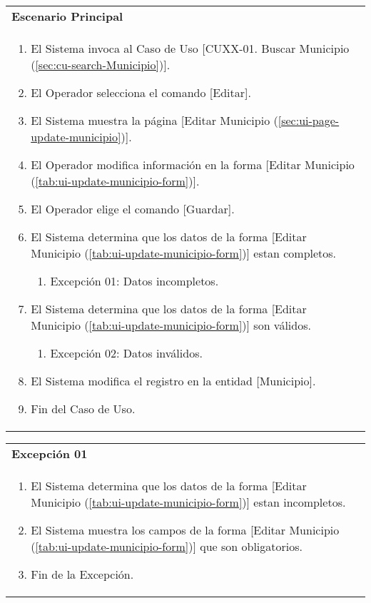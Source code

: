 \begin{tabular}{ p{15.5cm} }
	\textbf{Escenario Principal} \\
	\begin{enumerate}
		\item El Sistema invoca al Caso de Uso [CUXX-01. Buscar Municipio (\ref{sec:cu-search-Municipio})].
		\item El Operador selecciona el comando [Editar].
		\item El Sistema muestra la página [Editar Municipio (\ref{sec:ui-page-update-municipio})].
		\item El Operador modifica información en la forma [Editar Municipio (\ref{tab:ui-update-municipio-form})].
		\item El Operador elige el comando [Guardar].
		\item El Sistema determina que los datos de la forma [Editar Municipio (\ref{tab:ui-update-municipio-form})] estan completos.
			\begin{enumerate}
				\item Excepción 01: Datos incompletos.
			\end{enumerate}
		\item El Sistema determina que los datos de la forma [Editar Municipio (\ref{tab:ui-update-municipio-form})] son válidos.
			\begin{enumerate}
				\item Excepción 02: Datos inválidos.
			\end{enumerate}
		\item El Sistema modifica el registro en la entidad [Municipio].
		\item Fin del Caso de Uso.
	\end{enumerate}
\end{tabular}

\begin{tabular}{ p{15.5cm} }
	\textbf{Excepción 01} \\
	\begin{enumerate}
		\item El Sistema determina que los datos de la forma [Editar Municipio (\ref{tab:ui-update-municipio-form})] estan incompletos.
		\item El Sistema muestra los campos de la forma [Editar Municipio (\ref{tab:ui-update-municipio-form})] que son obligatorios.
		\item Fin de la Excepción.
	\end{enumerate}
\end{tabular}

